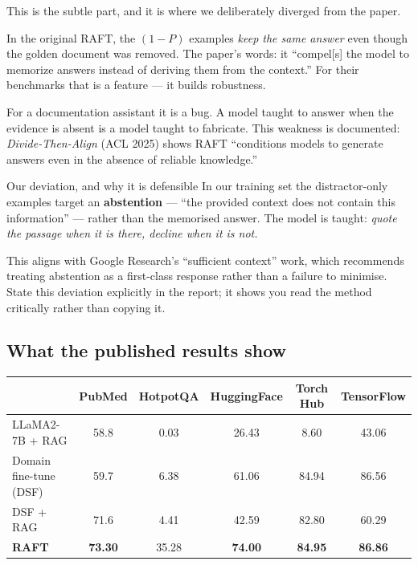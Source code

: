 \documentclass[11pt,a4paper]{article}
\begin{document}
This is the subtle part, and it is where we deliberately diverged from the paper.

In the original RAFT, the $(1-P)$ examples \emph{keep the same answer} even though
the golden document was removed. The paper's words: it ``compel[s] the model to
memorize answers instead of deriving them from the context.'' For their benchmarks
that is a feature --- it builds robustness.

For a documentation assistant it is a bug. A model taught to answer when the
evidence is absent is a model taught to fabricate. This weakness is documented:
\emph{Divide-Then-Align} (ACL 2025) shows RAFT ``conditions models to generate
answers even in the absence of reliable knowledge.''

\begin{keybox}{{Our deviation, and why it is defensible}}
In our training set the distractor-only examples target an \textbf{abstention} ---
``the provided context does not contain this information'' --- rather than the
memorised answer. The model is taught: \emph{quote the passage when it is there,
decline when it is not.}

This aligns with Google Research's ``sufficient context'' work, which recommends
treating abstention as a first-class response rather than a failure to minimise.
State this deviation explicitly in the report; it shows you read the method
critically rather than copying it.
\end{keybox}

\subsection{What the published results show}

\begin{table}[h]\centering\small
\begin{tabular}{l ccccc}
\toprule
 & \textbf{PubMed} & \textbf{HotpotQA} & \textbf{HuggingFace} & \textbf{Torch Hub} & \textbf{TensorFlow} \\
\midrule
LLaMA2-7B + RAG & 58.8 & 0.03 & 26.43 & 8.60 & 43.06 \\
\rowcolor{rowgray} Domain fine-tune (DSF) & 59.7 & 6.38 & 61.06 & 84.94 & 86.56 \\
DSF + RAG & 71.6 & 4.41 & 42.59 & 82.80 & 60.29 \\
\rowcolor{rowgray} \textbf{RAFT} & \textbf{73.30} & 35.28 & \textbf{74.00} & \textbf{84.95} & \textbf{86.86} \\
\bottomrule
\end{tabular}
\end{table}
\end{document}
